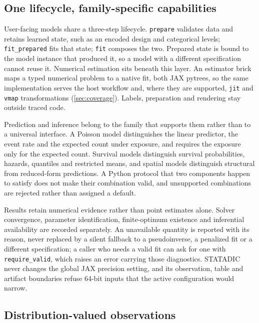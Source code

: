 \subsection{One lifecycle, family-specific capabilities}

User-facing models share a three-step lifecycle. \texttt{prepare} validates
data and retains learned state, such as an encoded design and categorical
levels; \texttt{fit\_prepared} fits that state; \texttt{fit} composes the two.
Prepared state is bound to the model instance that produced it, so a model with
a different specification cannot reuse it. Numerical estimation sits beneath
this layer. An estimator brick maps a typed numerical problem to a native fit,
both JAX pytrees, so the same implementation serves the host workflow and,
where they are supported, \texttt{jit} and \texttt{vmap} transformations
(\cref{sec:coverage}). Labels, preparation and rendering stay outside traced
code.

Prediction and inference belong to the family that supports them rather than
to a universal interface. A Poisson model distinguishes the linear predictor,
the event rate and the expected count under exposure, and requires the exposure
only for the expected count. Survival models
distinguish survival probabilities, hazards, quantiles and restricted means,
and spatial models distinguish structural from reduced-form predictions. A
Python protocol that two components happen to satisfy does not make their
combination valid, and unsupported combinations are rejected rather than
assigned a default.

Results retain numerical evidence rather than point estimates alone. Solver
convergence, parameter identification, finite-optimum existence and
inferential availability are recorded separately. An unavailable quantity is
reported with its reason, never replaced by a silent fallback to a
pseudoinverse, a penalized fit or a different specification; a caller who
needs a valid fit can ask for one with \texttt{require\_valid}, which raises an
error carrying those diagnostics. STATADIC never changes the global JAX precision
setting, and its observation, table and artifact boundaries refuse 64-bit
inputs that the active configuration would narrow.

\subsection{Distribution-valued observations}

